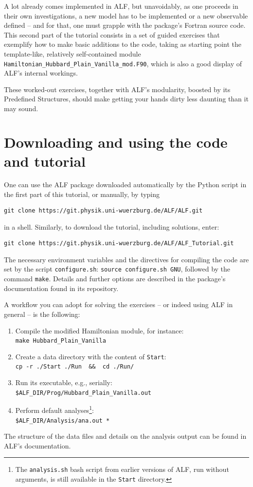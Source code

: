 \documentclass[10pt,modern]{scrartcl}
\numberwithin{exerciseitem}{exercise} %
\begin{document}
A lot already comes implemented in ALF, but unavoidably, as one proceeds in their own investigations, a new model has to be implemented or a new observable defined -- and for that, one must grapple with the package's Fortran source code. 
This second part of the tutorial consists in a set of guided exercises that exemplify how to make basic additions to the code, taking as starting point the template-like, relatively self-contained module \texttt{Hamiltonian\_Hubbard\_Plain\_Vanilla\_mod.F90}, which is also a good display of ALF's internal workings.

These worked-out exercises, together with ALF's modularity, boosted by its Predefined Structures, should make getting your hands dirty less daunting than it may sound.


\section*{Downloading and using the code and tutorial}
One can use the ALF package downloaded automatically by the Python script in the first part of this tutorial, or manually, by typing
\begin{lstlisting}[style=bash]
git clone https://git.physik.uni-wuerzburg.de/ALF/ALF.git
\end{lstlisting}
in a shell. Similarly, to download the tutorial, including solutions, enter:
\begin{lstlisting}[style=bash]
git clone https://git.physik.uni-wuerzburg.de/ALF/ALF_Tutorial.git
\end{lstlisting}

The necessary environment variables and the directives for compiling the code are set by the script \texttt{configure.sh}: \lstinline[style=bash]|source configure.sh GNU|, followed by the command  \lstinline[style=bash,morekeywords={make}]|make|. Details and further options are described in the package's documentation found in its repository.

A workflow you can adopt for solving the exercises -- or indeed using ALF in general -- is the following:
\begin{enumerate}
	\item Compile the modified Hamiltonian module, for instance:\\
	\lstinline[style=bash,morekeywords={make}]{make Hubbard_Plain_Vanilla}
	\item Create a data directory with the content of \texttt{Start}:\\
	\lstinline[style=bash,morekeywords={cp}]{cp -r ./Start ./Run  &&  cd ./Run/}
	\item Run its executable, e.g., serially:\\
	\lstinline[style=bash]{$ALF_DIR/Prog/Hubbard_Plain_Vanilla.out} %
	\item Perform default analyses\footnote{The \texttt{analysis.sh} bash script from earlier versions of ALF, run without arguments, is still available in the \texttt{Start} directory.}:\\
	\lstinline[style=bash]{$ALF_DIR/Analysis/ana.out *} %
\end{enumerate}
The structure of the data files and details on the analysis output can be found in ALF's documentation.
\end{document}
